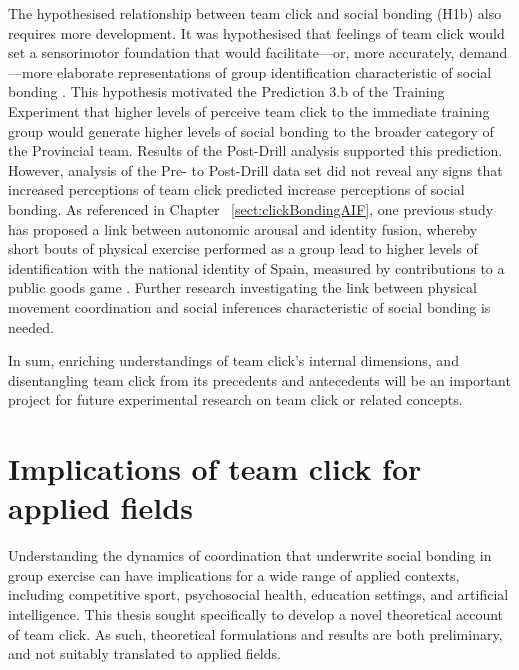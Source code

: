 The hypothesised relationship between team click and social bonding (H1b) also requires more development.  It was hypothesised that feelings of team click would set a sensorimotor foundation that would facilitate—or, more accurately, demand---more elaborate representations of group identification characteristic of social bonding \citep{Pezzulo2014}.  This hypothesis motivated the Prediction 3.b of the Training Experiment that higher levels of perceive team click to the immediate training group would generate higher levels of social bonding to the broader category of the Provincial team.  Results of the Post-Drill analysis supported this prediction. However, analysis of the Pre- to Post-Drill data set did not reveal any signs that increased perceptions of team click predicted increase perceptions of social bonding.  As referenced in Chapter ~\ref{sect:clickBondingAIF}, one previous study has proposed a link between autonomic arousal and identity fusion, whereby short bouts of physical exercise performed as a group lead to higher levels of identification with the national identity of Spain, measured by contributions to a public goods game \citep[824][]{Swann2010}.  Further research investigating the link between physical movement coordination and social inferences characteristic of social bonding is needed.

In sum, enriching understandings of team click's internal dimensions, and disentangling team click from its precedents and antecedents will be an important project for future experimental research on team click or related concepts.


\section{Implications of team click for applied fields}
Understanding the dynamics of coordination that underwrite social bonding in group exercise can have implications for a wide range of applied contexts, including competitive sport, psychosocial health, education settings, and artificial intelligence.  This thesis sought specifically to develop a novel theoretical account of team click. As such, theoretical formulations and results are both preliminary, and not suitably translated to applied fields.



